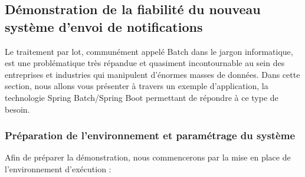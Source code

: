 \subsection{Démonstration de la fiabilité du nouveau système d'envoi de notifications}
Le traitement par lot, communément appelé Batch dans le jargon informatique, est une problématique très répandue et quasiment incontournable au sein des entreprises et industries qui manipulent d’énormes masses de données. Dans cette section, nous allons vous présenter à travers un exemple d’application, la technologie Spring Batch/Spring Boot permettant de répondre à ce type de besoin.
\subsubsection{Préparation de l'environnement et paramétrage du système}
Afin de préparer la démonstration, nous commencerons par la mise en place de l'environnement d'exécution :
